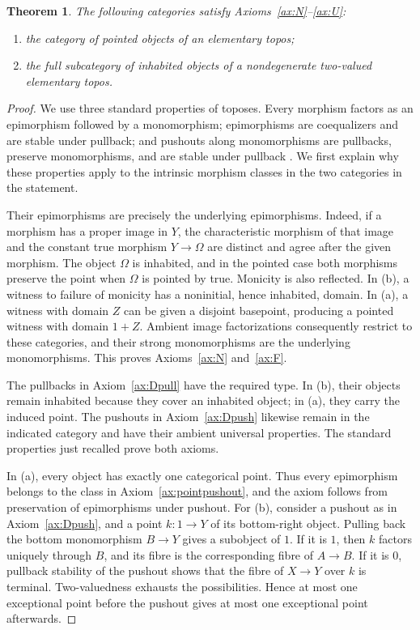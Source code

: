 \documentclass[11pt,a4paper]{article}
\theoremstyle{plain}
\newtheorem{theorem}{Theorem}[section]
\theoremstyle{definition}
\theoremstyle{remark}
\begin{document}
\begin{theorem}\label{concl:topos-examples}
The following categories satisfy Axioms~\ref{ax:N}--\ref{ax:U}:
\begin{enumerate}
\item the category of pointed objects of an elementary topos;
\item the full subcategory of inhabited objects of a nondegenerate
two-valued elementary topos.
\end{enumerate}
\end{theorem}
\begin{proof}
We use three standard properties of toposes. Every morphism factors
as an epimorphism followed by a monomorphism; epimorphisms are
coequalizers and are stable under pullback; and pushouts along
monomorphisms are pullbacks, preserve monomorphisms, and are stable
under pullback \cite{MacLaneMoerdijk,Lack}. We first explain why
these properties apply to the intrinsic morphism classes in the
two categories in the statement.

Their epimorphisms are precisely the underlying epimorphisms. Indeed,
if a morphism has a proper image in $Y$, the characteristic morphism
of that image and the constant true morphism $Y\to\Omega$ are
distinct and agree after the given morphism. The object $\Omega$ is
inhabited, and in the pointed case both morphisms preserve the point
when $\Omega$ is pointed by true. Monicity is also reflected. In
(b), a witness to failure of monicity has a noninitial, hence
inhabited, domain. In (a), a witness with domain $Z$ can be given a
disjoint basepoint, producing a pointed witness with domain $1+Z$.
Ambient image factorizations consequently restrict to these
categories, and their strong monomorphisms are the underlying
monomorphisms. This proves Axioms~\ref{ax:N} and~\ref{ax:F}.

The pullbacks in Axiom~\ref{ax:Dpull} have the required type.
In (b), their objects remain inhabited because they cover an
inhabited object; in (a), they carry the induced point. The
pushouts in Axiom~\ref{ax:Dpush} likewise remain in the indicated
category and have their ambient universal properties. The standard
properties just recalled prove both axioms.

In (a), every object has exactly one categorical point. Thus every
epimorphism belongs to the class in Axiom~\ref{ax:pointpushout},
and the axiom follows from preservation of epimorphisms under
pushout. For (b), consider a pushout as in
Axiom~\ref{ax:Dpush}, and a point $k:1\to Y$ of its bottom-right
object. Pulling back the bottom monomorphism $B\to Y$ gives a
subobject of $1$. If it is $1$, then $k$ factors uniquely through
$B$, and its fibre is the corresponding fibre of $A\to B$.
If it is $0$, pullback stability of the pushout shows that the
fibre of $X\to Y$ over $k$ is terminal. Two-valuedness exhausts
the possibilities. Hence at most one exceptional point before the
pushout gives at most one exceptional point afterwards.


\end{proof}
\end{document}

